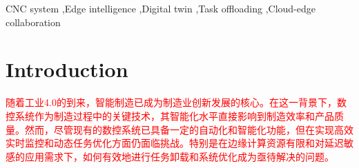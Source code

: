 \documentclass[preprint,12pt]{elsarticle}
\begin{document}
\begin{frontmatter}
\begin{keyword}
CNC system \sep Edge intelligence \sep Digital twin \sep Task offloading \sep Cloud-edge collaboration


\end{keyword}

\end{frontmatter}


\section{Introduction}

\textcolor{red}{随着工业4.0的到来，智能制造已成为制造业创新发展的核心。在这一背景下，数控系统作为制造过程中的关键技术，其智能化水平直接影响到制造效率和产品质量。然而，尽管现有的数控系统已具备一定的自动化和智能化功能，但在实现高效实时监控和动态任务优化方面仍面临挑战。特别是在边缘计算资源有限和对延迟敏感的应用需求下，如何有效地进行任务卸载和系统优化成为亟待解决的问题。}
\end{document}
